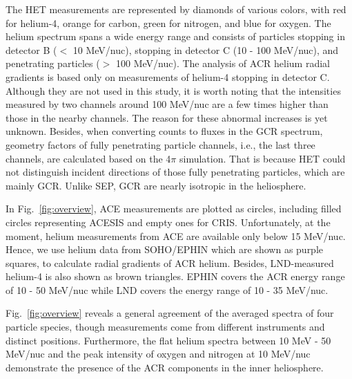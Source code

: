 The \ac{HET} measurements are represented by diamonds of various colors, with red for helium-4, orange for carbon, green for nitrogen, and blue for oxygen.
The helium spectrum spans a wide energy range and consists of particles stopping in detector B ($<$ 10 MeV/nuc), stopping in detector C (10 - 100 MeV/nuc), and penetrating particles ($>$ 100 MeV/nuc). 
The analysis of \ac{ACR} helium radial gradients is based only on measurements of helium-4 stopping in detector C.
Although they are not used in this study, it is worth noting that the intensities measured by two channels around 100 MeV/nuc are a few times higher than those in the nearby channels. The reason for these abnormal increases is yet unknown.
Besides, when converting counts to fluxes in the \ac{GCR} spectrum, geometry factors of fully penetrating particle channels, i.e., the last three channels, are calculated based on the 4$\pi$ simulation. That is because \ac{HET} could not distinguish incident directions of those fully penetrating particles, which are mainly \acs{GCR}. Unlike \acs{SEP}, \acs{GCR} are nearly isotropic in the heliosphere.

In Fig.~\ref{fig:overview}, \ac{ACE} measurements are plotted as circles, including filled circles representing \ac{ACESIS} and empty ones for \ac{CRIS}. Unfortunately, at the moment, helium measurements from \ac{ACE} are available only below 15 MeV/nuc. Hence, we use helium data from \ac{SOHO}/\ac{EPHIN} which are shown as purple squares, to calculate radial gradients of \ac{ACR} helium. Besides, \ac{LND}-measured helium-4 is also shown as brown triangles. \ac{EPHIN} covers the \ac{ACR} energy range of 10 - 50 MeV/nuc while \ac{LND} covers the energy range of 10 - 35 MeV/nuc.

Fig.~\ref{fig:overview} reveals a general agreement of the averaged spectra of four particle species, though measurements come from different instruments and distinct positions. Furthermore, the flat helium spectra between 10 MeV - 50 MeV/nuc and the peak intensity of oxygen and nitrogen at 10 MeV/nuc demonstrate the presence of the \ac{ACR} components in the inner heliosphere. 

